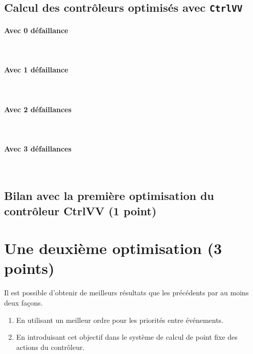 \documentclass[a4paper]{book}
\begin{document}
\subsection{Calcul des contrôleurs optimisés avec {\tt CtrlVV}}
\paragraph{Avec 0 défaillance}\ \\


\paragraph{Avec 1 défaillance}\ \\


\paragraph{Avec 2 défaillances}\ \\


\paragraph{Avec 3 défaillances}\ \\


\subsection{Bilan avec la première optimisation du contrôleur CtrlVV (1 point)}

\section{Une deuxième optimisation (3 points)}
Il est possible d'obtenir de meilleurs résultats que les précédents par au moins deux façons.
\begin{enumerate}
\item En utilisant un meilleur ordre pour les priorités entre événements.
\item En introduisant cet objectif dans le système de calcul de point fixe des actions du contrôleur.
\end{enumerate}
\end{document}
